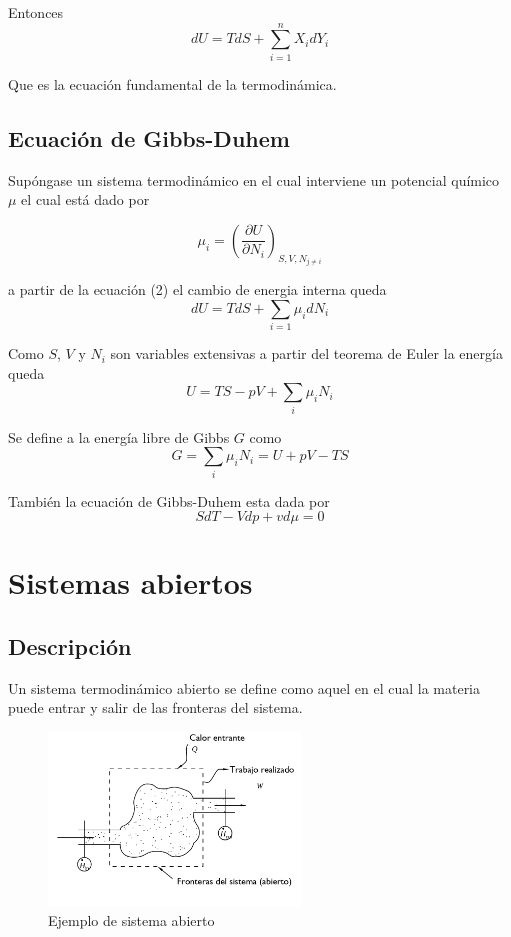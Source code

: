 \documentclass[a4paper,12pt]{article}
\begin{document}
Entonces
\begin{equation}
	dU = T dS + \sum_{i=1}^{n} X_i dY_i
\end{equation}

Que es la ecuación fundamental de la termodinámica.

\subsection{Ecuación de Gibbs-Duhem}
Supóngase un sistema termodinámico en el cual interviene un potencial químico $\mu$ el cual está dado por

\[
	\mu_i = \left( \frac{\partial U}{\partial N_i} \right)_{S,V,N_{j \neq i}}
\]

a partir de la ecuación (2) el cambio de energia interna queda
\[
	d U = T dS + \sum_{i=1} \mu_i d N_i
\]

Como $S$, $V$ y $N_i$ son variables extensivas a partir del teorema de Euler la energía queda
\[
	U = TS - pV + \sum_i \mu_i N_i
\]

Se define a la energía libre de Gibbs $G$ como
\[
	G = \sum_i \mu_i N_i = U + pV - TS
\]

También la ecuación de Gibbs-Duhem esta dada por
\[
	S dT - V dp + v d \mu = 0
\]

\section{Sistemas abiertos}

\subsection{Descripción}
Un sistema termodinámico abierto se define como aquel en el cual la materia puede entrar y salir de las fronteras del sistema.

\begin{figure}[h!]
	\centering
		\includegraphics[width=0.60\textwidth]{Figure1.png}
	\caption{Ejemplo de sistema abierto}
\end{figure}
\end{document}
